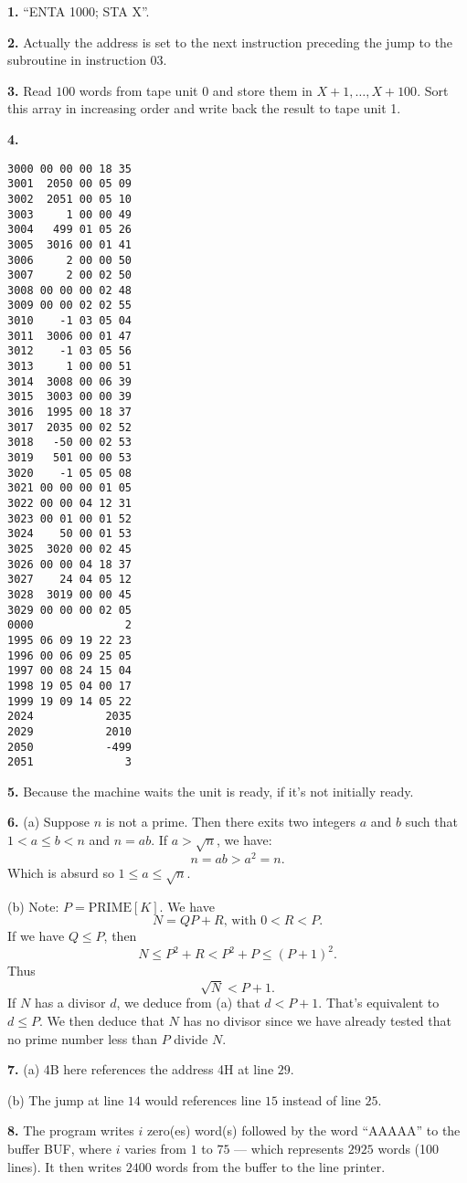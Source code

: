 \documentclass[a4paper,12pt]{article}
\newcommand{\newpar}[1]{\bigskip \noindent \textbf{#1.}}
\newcommand{\subpar}[1]{\medskip \noindent (#1)}
\begin{document}
\newpar{1} ``ENTA 1000; STA X''.

\newpar{2} Actually the address is set to the next instruction
preceding the jump to the subroutine in instruction $03$.

\newpar{3} Read $100$ words from tape unit 0 and store them in $X+1,
\ldots, X+100$.  Sort this array in increasing order and write back
the result to tape unit 1.

\newpar{4}
\begin{verbatim}
3000 00 00 00 18 35
3001  2050 00 05 09
3002  2051 00 05 10
3003     1 00 00 49
3004   499 01 05 26
3005  3016 00 01 41
3006     2 00 00 50
3007     2 00 02 50
3008 00 00 00 02 48
3009 00 00 02 02 55
3010    -1 03 05 04
3011  3006 00 01 47
3012    -1 03 05 56
3013     1 00 00 51
3014  3008 00 06 39
3015  3003 00 00 39
3016  1995 00 18 37
3017  2035 00 02 52
3018   -50 00 02 53
3019   501 00 00 53
3020    -1 05 05 08
3021 00 00 00 01 05
3022 00 00 04 12 31
3023 00 01 00 01 52
3024    50 00 01 53
3025  3020 00 02 45
3026 00 00 04 18 37
3027    24 04 05 12
3028  3019 00 00 45
3029 00 00 00 02 05
0000              2
1995 06 09 19 22 23
1996 00 06 09 25 05
1997 00 08 24 15 04
1998 19 05 04 00 17
1999 19 09 14 05 22
2024           2035
2029           2010
2050           -499
2051              3
\end{verbatim}

\newpar{5} Because the machine waits the unit is ready, if it's not
initially ready.

\newpar{6}
\subpar{a}  Suppose $n$ is not a prime.  Then there exits two integers
$a$ and $b$ such that $1 < a\le b <n$ and $n = ab$.  If $a > \sqrt{n}$,
we have:
\[ n = a b > a^2 = n.\]
Which is absurd so $1 \le a \le \sqrt{n}$.

\subpar{b} Note: $P = \mathrm{PRIME}[K]$.  We have
\[ N = Q P + R,\,\mbox{with $0 < R  < P$}.\]
If we have $Q \le P$, then
\[ N \le P^2 + R < P^2 + P \le (P+1)^2.\]
Thus
\[ \sqrt{N} < P+1.\]
If $N$ has a divisor $d$, we deduce from (a) that $d < P+1$.  That's
equivalent to $d \le P$.  We then deduce that $N$ has no divisor since
we have already tested that no prime number less than $P$ divide $N$.

\newpar{7}
\subpar{a} 4B here references the address 4H at line $29$.

\subpar{b} The jump at line $14$ would references line $15$ instead of
line $25$.

\newpar{8} The program writes $i$ zero(es) word(s) followed by the word
``AAAAA'' to the buffer BUF, where $i$ varies from $1$ to $75$ ---
which represents $2925$ words (100 lines).  It then writes $2400$ words from the
buffer to the line printer.
\end{document}
